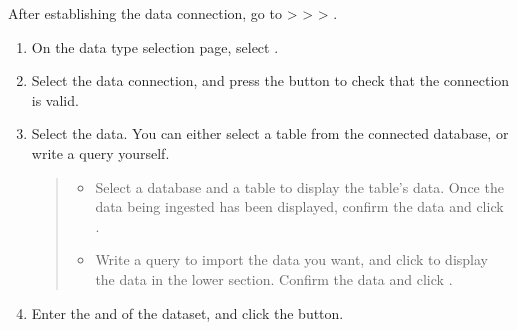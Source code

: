 \documentclass[letterpaper,10pt,english]{sphinxmanual}
\begin{document}
After establishing the data connection, go to  \textgreater{}  \textgreater{}  \textgreater{} .
\begin{enumerate}
\def\theenumi{\arabic{enumi}}
\def\labelenumi{\theenumi .}
\makeatletter\def\p@enumii{\p@enumi \theenumi .}\makeatother
\item {} 
On the data type selection page, select .

\item {} 
Select the data connection, and press the  button to check that the connection is valid.
\begin{quote}

\begin{figure}[H]
\centering

\noindent{}
\end{figure}
\end{quote}

\item {} 
Select the data. You can either select a table from the connected database, or write a query yourself.
\begin{quote}

\begin{figure}[H]
\centering

\noindent{}
\end{figure}
\begin{itemize}
\item {} 
 Select a database and a table to display the table’s data. Once the data being ingested has been displayed, confirm the data and click .

\item {} 
 Write a query to import the data you want, and click  to display the data in the lower section. Confirm the data and click .

\end{itemize}
\end{quote}

\item {} 
Enter the  and  of the dataset, and click the  button.
\begin{quote}


\end{quote}
\end{enumerate}
\end{document}
